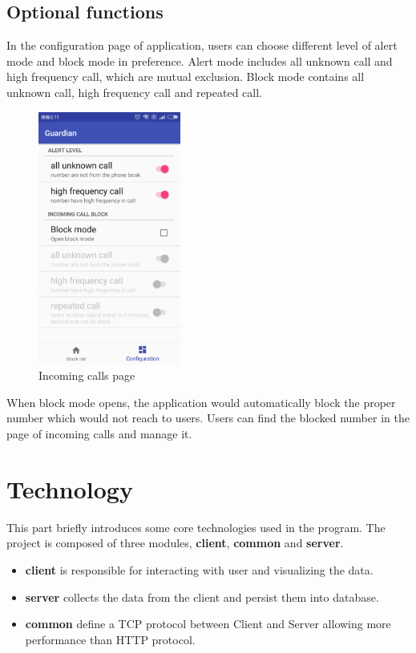 \documentclass{article}
\begin{document}
    \subsection{Optional functions}
    In the configuration page of application, users can choose different level of alert mode and block mode in preference.
    Alert mode includes all unknown call and high frequency call, which are mutual exclusion.
    Block mode contains all unknown call, high frequency call and repeated call.
    \begin{figure}[H]
        \centering
        \includegraphics[width=0.418\textwidth]{images/config.jpg}
        \caption{Incoming calls page}
        \label{image_block}
    \end{figure}
    When block mode opens, the application would automatically block the proper number which would not reach to users.
    Users can find the blocked number in the page of incoming calls and manage it.

    \section{Technology}
    This part briefly introduces some core technologies used in the program.
    The project is composed of three modules, \textbf{client}, \textbf{common} and \textbf{server}.

    \begin{itemize}
        \item \textbf{client} is responsible for interacting with user and visualizing the data.
        \item \textbf{server} collects the data from the client and persist them into database.
        \item \textbf{common} define a TCP protocol between Client and Server allowing more performance than HTTP protocol.
    \end{itemize}
\end{document}
